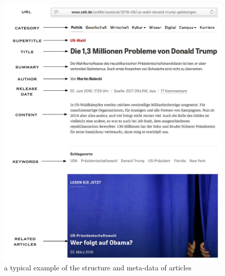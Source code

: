     
    \begin{figure}[!htb]
    \centering
    \includegraphics[width=1\textwidth]{fig/article.pdf}
    \caption{a typical example of the structure and meta-data of articles}
    \label{fig:article_structure}
    \end{figure}

